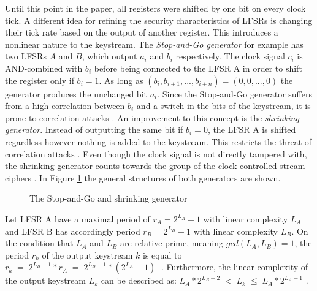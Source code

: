 Until this point in the paper, all registers were shifted by one bit on every clock tick. A different idea for refining the security characteristics of LFSRs is changing their tick rate based on the output of another register. This introduces a nonlinear nature to the keystream. The \emph{Stop-and-Go generator} for example has two LFSRs $A$ and $B$, which output $a_i$ and $b_i$ respectively. The clock signal $c_i$ is AND-combined with $b_i$ before being connected to the LFSR A in order to shift the register only if $b_i=1$. As long as $(b_i, b_{i+1}, ..., b_{i+n}) = (0,0,...,0)$ the generator produces the unchanged bit $a_i$. \cite[pp. 89-90]{Beth.1985b} Since the Stop-and-Go generator suffers from a high correlation between $b_i$ and a switch in the bits of the keystream, it is prone to correlation attacks \cite[p. 156]{Klein.2013}. An improvement to this concept is the \emph{shrinking generator}. Instead of outputting the same bit if $b_i=0$, the LFSR A is shifted regardless however nothing is added to the keystream. This restricts the threat of correlation attacks \cite[p. 159]{Klein.2013}. Even though the clock signal is not directly tampered with, the shrinking generator counts towards the group of the clock-controlled stream ciphers \cite[p. 23]{Robshaw.1995}. In Figure \ref{fig:clocked-generators} the general structures of both generators are shown.

\begin{figure}[htpb]
	\vspace{0.5cm}
	\centering
	\small
	\caption{The Stop-and-Go \cite[pp. 89-90]{Beth.1985b} and shrinking generator \cite[p. 159]{Klein.2013}}
	\label{fig:clocked-generators}
	\vspace{0.3cm}
\end{figure}

Let LFSR A have a maximal period of $r_A=2^{L_A}-1$ with linear complexity $L_A$ and LFSR B has accordingly period $r_B=2^{L_B}-1$ with linear complexity $L_B$. On the condition that $L_A$ and $L_B$ are relative prime, meaning $gcd(L_A, L_B)=1$, the period $r_k$ of the output keystream $k$ is equal to $r_k\;=\;2^{L_B-1}*r_A\;=\;2^{L_B-1}*(2^{L_A}-1)\;$ \cite[p. 25]{coppersmith1993shrinking}\cite[p. 159]{Klein.2013}. Furthermore, the linear complexity of the output keystream $L_k$ can be described as: \space $L_A*2^{L_B-2} \;<\; L_k \;\leq\; L_A*2^{L_A-1}$ \cite[p. 25]{coppersmith1993shrinking}. \\

